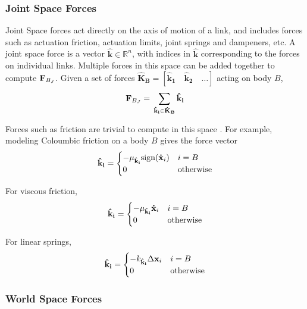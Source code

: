 \subsubsection{Joint Space Forces}
Joint Space forces act directly on the axis of motion of a link, and includes forces such as actuation friction, actuation limits, joint springs and dampeners, etc. A joint space force is a vector $\hat{\mathbf{k}} \in \mathbb{R}^n$, with indices in $\hat{\mathbf{k}}$ corresponding to the forces on individual links. Multiple forces in this space can be added together to compute ${\mathbf{F}}_{B_J}$. Given a set of forces $\mathbf{\hat{K}_B} = \left [ \mathbf{\hat{k}_1} \quad \mathbf{\hat{k}_2} \quad \hdots \right ]$ acting on body $B$, 
\begin{align}
	{\mathbf{F}}_{B_J} = \Big.\sum_{\mathbf{\hat{k}_i} \in \mathbf{\hat{K}_B}}\mathbf{\hat{k}_i}
\end{align}

\noindent Forces such as friction are trivial to compute in this space \Cite{lynch_park_2019}. For example, modeling Coloumbic friction on a body $B$ gives the force vector 
\begin{align} \label{eqn:coulomb}
    \mathbf{\hat{k}_i} = 
    \begin{cases}
         - \mu_{\mathbf{\hat{k}_i}}\text{sign}({\mathbf{\dot{x}}}_i) & i = B \\
         0 & \text{otherwise}
    \end{cases}
\end{align}

\noindent For viscous friction,
\begin{align} \label{eqn:viscous}
    \mathbf{\hat{k}_i} = 
    \begin{cases}
         - \mu_{\mathbf{\hat{k}_i}}{\mathbf{\dot{x}}}_i & i = B \\
         0 & \text{otherwise}
    \end{cases}
\end{align}

\noindent For linear springs,
\begin{align} \label{eqn:spring}
    \mathbf{\hat{k}_i} = 
    \begin{cases}
         - k_{\mathbf{\hat{k}_i}}\Delta {\mathbf{{x}}}_i & i = B \\
         0 & \text{otherwise}
    \end{cases}
\end{align}

\subsubsection{World Space Forces}

